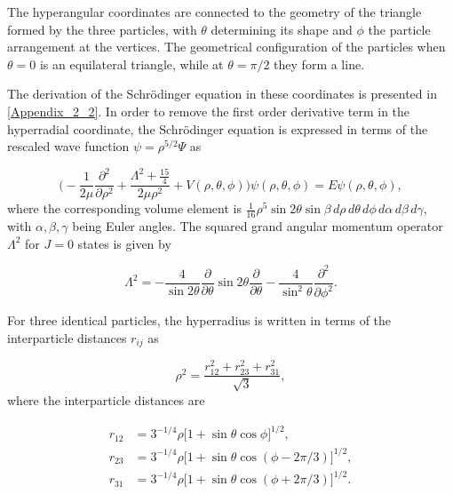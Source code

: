 The hyperangular coordinates are connected to the geometry of the triangle formed by the three particles, with $\theta$ determining its shape and $\phi$ the particle arrangement at the vertices. The geometrical configuration of the particles when $\theta = 0$ is an equilateral triangle, while at $\theta=\pi/2$ they form a line. 

The derivation of the Schr{\"o}dinger equation in these coordinates is presented in \cref{Appendix_2_2}. In order to remove the first order derivative term in the hyperradial coordinate, the Schr{\"o}dinger equation is expressed in terms of the rescaled wave function $\psi = \rho^{5/2}\Psi$ as

\begin{equation}
 \bigg(-\frac{1}{2 \mu}\frac{\partial^2}{\partial \rho^2} + \frac{ \Lambda^2 + \frac{15}{4}}{2 \mu \rho^{2}}+ V(\rho, \theta, \phi)\bigg)\psi(\rho,\theta,\phi) = E\psi(\rho,\theta,\phi),
\end{equation}
where the corresponding volume element is $
\frac{1}{16}\rho^5 \sin 2\theta\sin\beta \,d\rho\,d\theta\,d\phi\, d\alpha\,d\beta\,d\gamma$, with $\alpha,\beta,\gamma$ being Euler angles. The squared grand angular momentum operator $\Lambda^2$ for $J=0$ states is given by

\begin{equation}\label{eq:grandangularmomentum}
\Lambda^2 = -\frac{4}{\sin 2\theta}\frac{\partial}{\partial \theta}\sin 2\theta \frac{\partial}{\partial \theta} - \frac{4}{\sin^2\theta}\frac{\partial^2}{\partial \phi^2}.
\end{equation}

For three identical particles, the hyperradius is written in terms of the interparticle distances $r_{ij}$ as

\begin{equation}
\rho^2 = \frac{r_{12}^2+r_{23}^2+r_{31}^2}{\sqrt{3}},
\end{equation}
where the interparticle distances are

\begin{equation}
\begin{aligned}
r_{12} &= 3^{-1/4}\rho\big[1+\sin\theta\cos\phi\big]^{1/2},\\
r_{23} &= 3^{-1/4}\rho\big[1 + \sin\theta\cos(\phi-2\pi/3)\big]^{1/2},\\
r_{31} &= 3^{-1/4}\rho\big[1 + \sin\theta\cos(\phi + 2\pi/3)\big]^{1/2}.
\end{aligned}
\end{equation}

